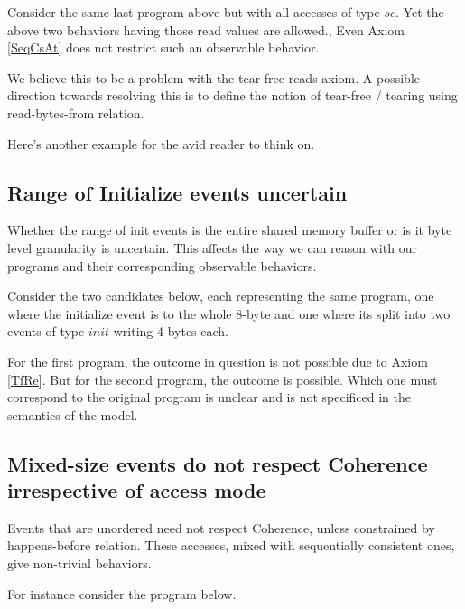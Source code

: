         Consider the same last program above but with all accesses of type $sc$. 
        Yet the above two behaviors having those read values are allowed.,
        Even Axiom \ref{SeqCsAt} does not restrict such an observable behavior.

        We believe this to be a problem with the tear-free reads axiom.
        A possible direction towards resolving this is to define the notion of tear-free / tearing using read-bytes-from relation. 

        Here's another example for the avid reader to think on. 


    \subsection{Range of Initialize events uncertain}

        Whether the range of init events is the entire shared memory buffer or is it byte level granularity is uncertain.
        This affects the way we can reason with our programs and their corresponding observable behaviors.

        Consider the two candidates below, each representing the same program, one where the initialize event is to the whole 8-byte and one where its split into two events of type $init$ writing 4 bytes each.


        For the first program, the outcome in question is not possible due to Axiom \ref{TfRe}.
        But for the second program, the outcome is possible.
        Which one must correspond to the original program is unclear and is not specificed in the semantics of the model.


    \subsection{Mixed-size events do not respect Coherence irrespective of access mode}

        Events that are unordered need not respect Coherence, unless constrained by happens-before relation.
        These accesses, mixed with sequentially consistent ones, give non-trivial behaviors.

        For instance  consider the program below.


